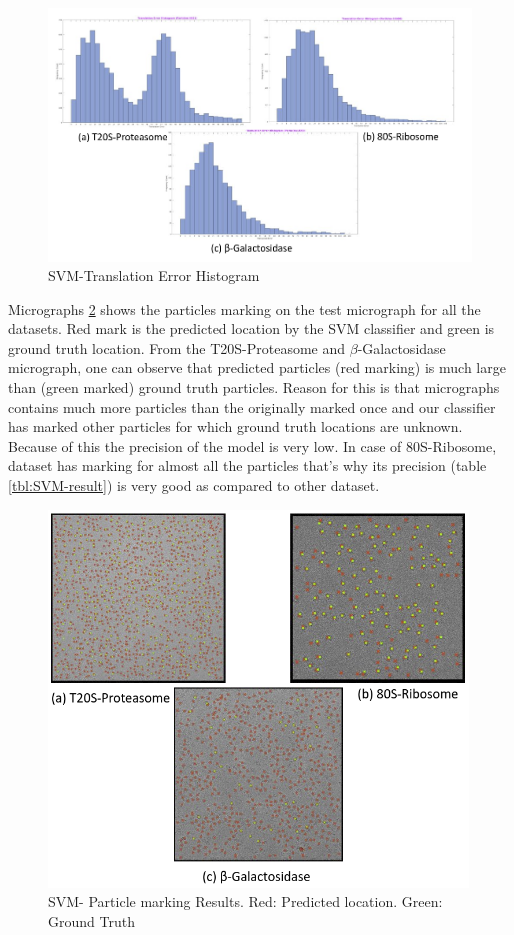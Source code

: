 \documentclass{report}
\begin{document}
\begin{figure}[H]
\includegraphics[width=1\linewidth]{svm-all-Translation_Error_Histogram.png}
\centering
\captionsetup{justification=centering}
\caption{SVM-Translation Error Histogram}
\label{fig: SVM-Translation_Error_Histogram}
\end{figure}

Micrographs \ref{fig: SVM-micrograph-marking} shows the particles marking on the test micrograph for all the datasets. Red mark is the predicted location by the SVM classifier and green is ground truth location. From the T20S-Proteasome and $\beta$-Galactosidase micrograph, one can observe that predicted particles (red marking) is much large than (green marked) ground truth particles. Reason for this is that micrographs contains much more particles than the originally marked once and  our classifier has marked other particles for which ground truth locations are unknown. Because of this the precision of the model is very low. In case of 80S-Ribosome, dataset has marking for almost all the particles that's why its precision (table \ref{tbl:SVM-result}) is very good as compared to other dataset.

\begin{figure}[H]
\includegraphics[width=0.98\linewidth,height=10cm]{svm-all-result.png}
\centering
\captionsetup{justification=centering}
\caption{SVM- Particle marking Results. Red: Predicted location. Green: Ground Truth}
\label{fig: SVM-micrograph-marking}
\end{figure}
\end{document}
